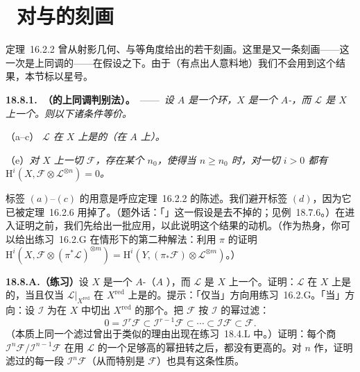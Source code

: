 
\section{\hard\ \trSerre{}对\trAmpleness{}与\trAffineness{}的刻画}

\mbox{定理~16.2.2} 曾从射影几何、\trGlobalGeneration{}与\trZariskiTopology{}等角度给出\trAmpleness{}的若干刻画。这里是又一条刻画——这一次是上同调的——在\trNoetherian{}假设之下。由于（有点出人意料地）我们不会用到这个结果，本节标以星号。

\textbf{18.8.1.\ \trhTheorem（\trAmpleness{}的\trSerre{}上同调判别法）。}\ ——\ \emph{设 $A$ 是一个\trNoether{}环，$X$ 是一个\trProper{} $A$-\trScheme，而 $\mathscr{L}$ 是 $X$ 上一个\trInvertibleSheaf。则以下诸条件等价。}

（a--c）\emph{\trInvertibleSheaf{} $\mathscr{L}$ 在 $X$ 上是\trAmple{}的（在 $A$ 上\trAmple）。}

（e）\emph{对 $X$ 上一切\trCoherentSheaf{} $\mathscr{F}$，存在某个 $n_0$，使得当 $n\ge n_0$ 时，对一切 $i>0$ 都有 $\mathrm{H}^i(X,\mathscr{F}\otimes\mathscr{L}^{\otimes n})=0$。}

标签 $(a)$--$(c)$ 的用意是呼应\mbox{定理~16.2.2} 的陈述。我们避开标签 $(d)$，因为它已被\mbox{定理~16.2.6} 用掉了。（题外话：「\trProperness」这一假设是去不掉的；见\mbox{例~18.7.6}。）在进入证明之前，我们先给出一批应用，以此说明这个结果的动机。（作为热身，你可以给出\mbox{练习~16.2.G} 在\trNoetherian{}情形下的第二种解法：利用 $\pi$ 的\trAffineness{}证明 $\mathrm{H}^i(X,\mathscr{F}\otimes(\pi^*\mathscr{L})^{\otimes m})=\mathrm{H}^i(Y,(\pi_*\mathscr{F})\otimes\mathscr{L}^{\otimes m})$。）

\textbf{18.8.A.（练习）}\quad 设 $X$ 是一个\trProper{} $A$-\trScheme（$A$ \trNoetherian），而 $\mathscr{L}$ 是 $X$ 上一个\trInvertibleSheaf。证明：$\mathscr{L}$ 在 $X$ 上是\trAmple{}的，当且仅当 $\mathscr{L}|_{X^{\mathrm{red}}}$ 在 $X^{\mathrm{red}}$ 上是\trAmple{}的。提示：「仅当」方向用\mbox{练习~16.2.G}。「当」方向：设 $\mathscr{I}$ 为在 $X$ 中切出\trClosedSubscheme{} $X^{\mathrm{red}}$ 的那个\trIdealSheaf。把 $\mathscr{F}$ 按 $\mathscr{I}$ 的幂过滤：
\[
0=\mathscr{I}^r\mathscr{F}\subset\mathscr{I}^{r-1}\mathscr{F}\subset\cdots\subset\mathscr{I}\mathscr{F}\subset\mathscr{F}.
\]
（本质上同一个滤过曾出于类似的理由出现在\mbox{练习~18.4.L} 中。）证明：每个商 $\mathscr{I}^n\mathscr{F}/\mathscr{I}^{n-1}\mathscr{F}$ 在用 $\mathscr{L}$ 的一个足够高的幂扭转之后，都没有更高的\trCohomology。对 $n$ 作\trDescendingInduction，证明滤过的每一段 $\mathscr{I}^n\mathscr{F}$（从而特别是 $\mathscr{F}$）也具有这条性质。


